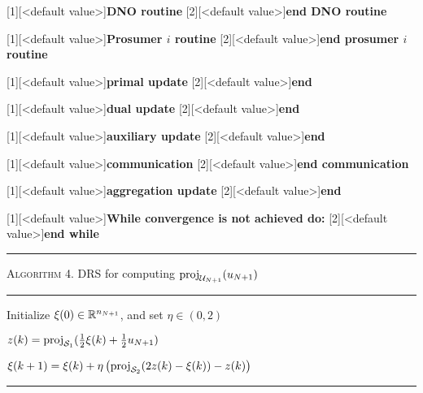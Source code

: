 [1][<default value>]{\textbf{DNO routine}}
[2][<default value>]{\textbf{end DNO routine}}

[1][<default value>]{\textbf{Prosumer $i$ routine}}
[2][<default value>]{\textbf{end prosumer $i$ routine}}

[1][<default value>]{\textbf{primal update}}
[2][<default value>]{\textbf{end}}

[1][<default value>]{\textbf{dual update}}
[2][<default value>]{\textbf{end}}

[1][<default value>]{\textbf{auxiliary update}}
[2][<default value>]{\textbf{end}}

[1][<default value>]{\textbf{communication}}
[2][<default value>]{\textbf{end communication}}

[1][<default value>]{\textbf{aggregation update}}
[2][<default value>]{\textbf{end}}

[1][<default value>]{\textbf{While convergence is not achieved do:}}
[2][<default value>]{\textbf{end while}}
\medskip 
\begin{minipage}{\columnwidth}
\hrule
\smallskip
\textsc{Algorithm 4}. {DRS for computing $\mathrm{proj}_{\mathcal U_{N+1}}(u_{N+1})$}
\smallskip
\hrule 
\smallskip
	\begin{algorithmic}[1]
		
		\smallskip
		\State Initialize $\xi(0) \in \mathbb R^{n_{N+1}}$, and set $\eta \in (0,2)$
		\IUC{ }
		
		\smallskip
		\State
		$z(k) = \mathrm{proj}_{\mathcal S_1}(\frac{1}{2} \xi(k) + \frac{1}{2} u_{N+1})$ 
		
		
		\smallskip
		\State
		$\xi(k+1) = \xi(k) + \eta \left( \mathrm{proj}_{\mathcal S_2}    (2z(k)-\xi(k)) - z(k)
		\right)$
		\EndIUC
		
	\end{algorithmic}
	\medskip
\hrule
\end{minipage}

\smallskip	

